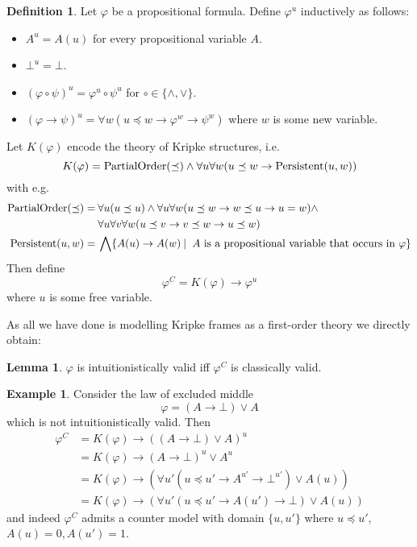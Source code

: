 \documentclass[a4paper,12pt]{report}
\theoremstyle{definition}
\theoremstyle{definition}
\theoremstyle{definition}
\newtheorem{lemma}[theorem]{Lemma}
\theoremstyle{definition}
\theoremstyle{definition}
\newtheorem{definition}[theorem]{Definition}
\theoremstyle{definition}
\newtheorem{example}[theorem]{Example}
\theoremstyle{definition}
\begin{document}
	\begin{definition}
		Let $\varphi$ be a propositional formula. Define $\varphi^{u}$ inductively as follows:
		\begin{itemize}
			\item $A^{u} = A(u)$ for every propositional variable $A$.
			\item $\bot^u = \bot$.
			\item $(\varphi\circ\psi)^u = \varphi^u\circ\psi^u$ for $\circ\in\{\wedge, \vee\}$.
			\item $(\varphi\to \psi)^u = \forall w(u\preceq w\to\varphi^{w}\to\psi^{w})$ where $w$ is some new variable.
		\end{itemize}
		Let $K(\varphi)$ encode the theory of Kripke structures, i.e.
		$$K(\varphi) = \text{\normalfont PartialOrder}(\preceq)\wedge\forall u\forall w(u\preceq w\to \text{\normalfont Persistent}(u, w))$$
		with e.g.
		\begin{align*}
			\text{\normalfont PartialOrder}(\preceq) =&\:\forall u(u\preceq u)\wedge\forall u\forall w(u\preceq w\to w\preceq u\to u = w)\wedge\\&\:\forall u\forall v\forall w(u\preceq v\to v\preceq w\to u\preceq w)\\
			\text{\normalfont Persistent}(u, w)=&\:\bigwedge \{A(u)\to A(w)\:|\: \text{ $A$ is a propositional variable that occurs in $\varphi$}\}
		\end{align*}
		Then define
		$$\varphi^{C} = K(\varphi)\to \varphi^{u}$$
		where $u$ is some free variable.
	\end{definition}
	
	\noindent As all we have done is modelling Kripke frames as a first-order theory we directly obtain:
	
	\begin{lemma}
		$\varphi$ is intuitionistically valid iff $\varphi^C$ is classically valid.
	\end{lemma}

	\begin{example}
		Consider the law of excluded middle $$\varphi = (A\to \bot)\vee A$$ which is not intuitionistically valid. Then
		\begin{align*}
			\varphi^{C} &= K(\varphi)\to ((A\to \bot)\vee A)^u\\
						 &= K(\varphi)\to (A\to \bot)^u\vee A^u\\
						 &= K(\varphi)\to (\forall u'( u\preceq u' \to A^{u'}\to \bot^{u'})\vee A(u))\\
						 &= K(\varphi)\to (\forall u' (u\preceq u' \to A(u')\to \bot)\vee A(u))
		\end{align*}
		and indeed $\varphi^{C}$ admits a counter model with domain $\{u, u'\}$ where $u \preceq u'$, $A(u) = 0, A(u') = 1$.
	\end{example}
	
\end{document}
